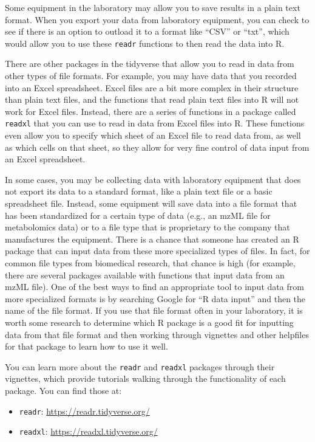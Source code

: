 \documentclass[]{tufte-book}
\providecommand{\tightlist}{%
  \setlength{\itemsep}{0pt}\setlength{\parskip}{0pt}}
\begin{document}
Some equipment in the laboratory may allow you to save results in a plain
text format. When you export your data from laboratory equipment, you can
check to see if there is an option to outload it to a format like ``CSV''
or ``txt'', which would allow you to use these \texttt{readr} functions to then
read the data into R.

There are other packages in the tidyverse that allow you to read in data
from other types of file formats. For example, you may have data that
you recorded into an Excel spreadsheet. Excel files are a bit more complex
in their structure than plain text files, and the functions that read
plain text files into R will not work for Excel files. Instead, there are
a series of functions in a package called \texttt{readxl} that you can use to
read in data from Excel files into R. These functions even allow you to
specify which sheet of an Excel file to read data from, as well as which
cells on that sheet, so they allow for very fine control of data input
from an Excel spreadsheet.

In some cases, you may be collecting data with laboratory equipment that does
not export its data to a standard format, like a plain text file or a
basic spreadsheet file. Instead, some equipment will save data into a file
format that has been standardized for a certain type of data (e.g., an mzML
file for metabolomics data) or to a file type that is proprietary to the
company that manufactures the equipment. There is a chance that someone has
created an R package that can input data from these more specialized types of
files. In fact, for common file types from biomedical research, that chance
is high (for example, there are several packages available with functions that
input data from an mzML file). One of the best ways to find an appropriate
tool to input data from more specialized formats is by searching Google for
``R data input'' and then the name of the file format. If you use that file
format often in your laboratory, it is worth some research to determine
which R package is a good fit for inputting data from that file format
and then working through vignettes and other helpfiles for that package to
learn how to use it well.

You can learn more about the \texttt{readr} and \texttt{readxl} packages through their
vignettes, which provide tutorials walking through the functionality of
each package. You can find those at:

\begin{itemize}
\tightlist
\item
  \texttt{readr}: \url{https://readr.tidyverse.org/}
\item
  \texttt{readxl}: \url{https://readxl.tidyverse.org/}
\end{itemize}
\end{document}
